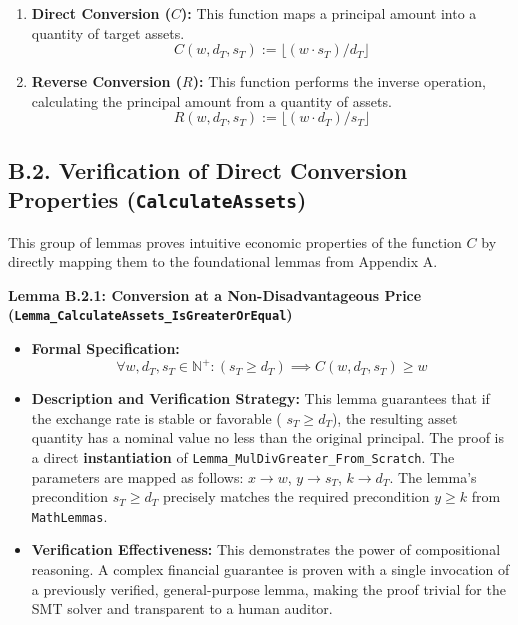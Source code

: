 \documentclass[
  english,
  onecolumn]{article}
\providecommand{\tightlist}{%
  \setlength{\itemsep}{0pt}\setlength{\parskip}{0pt}}
\begin{document}
\begin{enumerate}
\def\labelenumi{\arabic{enumi}.}
\item
  \textbf{Direct Conversion (\(C\)):} This function maps a principal
  amount into a quantity of target assets.
  \[ C(w, d_T, s_T) := \lfloor (w \cdot s_T) / d_T \rfloor \]
\item
  \textbf{Reverse Conversion (\(R\)):} This function performs the
  inverse operation, calculating the principal amount from a quantity of
  assets. \[ R(w, d_T, s_T) := \lfloor (w \cdot d_T) / s_T \rfloor \]
\end{enumerate}

\subsection{\texorpdfstring{B.2. Verification of Direct Conversion
Properties
(\texttt{CalculateAssets})}{B.2. Verification of Direct Conversion Properties (CalculateAssets)}}\label{b.2.-verification-of-direct-conversion-properties-calculateassets}

This group of lemmas proves intuitive economic properties of the
function \(C\) by directly mapping them to the foundational lemmas from
Appendix A.

\textbf{Lemma B.2.1: Conversion at a Non-Disadvantageous Price
(\texttt{Lemma\_CalculateAssets\_IsGreaterOrEqual})}

\begin{itemize}
\tightlist
\item
  \textbf{Formal Specification:}
  \[ \forall w, d_T, s_T \in \mathbb{N}^+ : (s_T \ge d_T) \implies C(w, d_T, s_T) \ge w \]
\item
  \textbf{Description and Verification Strategy:} This lemma guarantees
  that if the exchange rate is stable or favorable ( \(s_T \ge d_T\)),
  the resulting asset quantity has a nominal value no less than the
  original principal. The proof is a direct \textbf{instantiation} of
  \texttt{Lemma\_MulDivGreater\_From\_Scratch}. The parameters are
  mapped as follows: \(x \to w\), \(y \to s_T\), \(k \to d_T\). The
  lemma's precondition \(s_T \ge d_T\) precisely matches the required
  precondition \(y \ge k\) from \texttt{MathLemmas}.
\item
  \textbf{Verification Effectiveness:} This demonstrates the power of
  compositional reasoning. A complex financial guarantee is proven with
  a single invocation of a previously verified, general-purpose lemma,
  making the proof trivial for the SMT solver and transparent to a human
  auditor.
\end{itemize}
\end{document}
